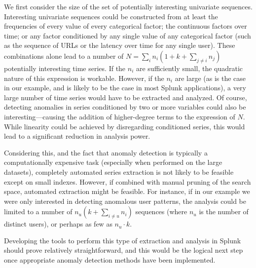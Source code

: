 We first consider the size of the set of potentially interesting univariate sequences. Interesting univariate sequences could be constructed from at least the frequencies of every value of every categorical factor; the continuous factors over time; or any factor conditioned by any single value of any categorical factor (such as the sequence of URLs or the latency over time for any single user). These combinations alone lead to a number of $N = \sum_i n_i (1 + k + \sum_{j \neq i} n_j)$ potentially interesting time series. If the $n_i$ are sufficiently small, the quadratic nature of this expression is workable. However, if the $n_i$ are large (as is the case in our example, and is likely to be the case in most Splunk applications), a very large number of time series would have to be extracted and analyzed. Of course, detecting anomalies in series conditioned by two or more variables could also be interesting---causing the addition of higher-degree terms to the expression of $N$. While linearity could be achieved by disregarding conditioned series, this would lead to a significant reduction in analysis power.

Considering this, and the fact that anomaly detection is typically a computationally expensive task (especially when performed on the large datasets), completely automated series extraction is not likely to be feasible except on small indexes. However, if combined with manual pruning of the search space, automated extraction might be feasible. For instance, if in our example we were only interested in detecting anomalous user patterns, the analysis could be limited to a number of $n_u (k + \sum_{i \neq u} n_i)$ sequences (where $n_u$ is the number of distinct users), or perhaps as few as $n_u \cdot k$.

Developing the tools to perform this type of extraction and analysis in Splunk should prove relatively straightforward, and this would be the logical next step once appropriate anomaly detection methods have been implemented.
